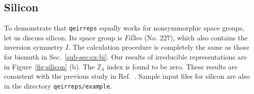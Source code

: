 \documentclass[3p,preprint]{elsarticle}
\newcommand{\mZ}{\mathbb{Z}}
\newcommand{\ono}[1]{ { \color{red} \footnotesize (\textsf{SO}) \textsf{\textsl{#1}} } }
\begin{document}

%
\subsection{Silicon}
\label{sub-sec:ex-si}
To demonstrate that \texttt{qeirreps} equally works for nonsymmorphic space groups, let us discuss silicon. Its space group is ${Fd\bar{3}m}$ (No. $227$), which also contains the inversion symmetry $I$. 
The calculation procedure is completely the same as those for bismuth in Sec.~\ref{sub-sec:ex-bi}. 
Our results of irreducible representations are in Figure~\ref{fig:silicon} (b). The $\mZ_4$ index is found to be zero. These results are consistent with the previous study in Ref.~\cite{Vergniory2019}. Sample input files for silicon are also in the directory \texttt{qeirreps/example}.
\end{document}
